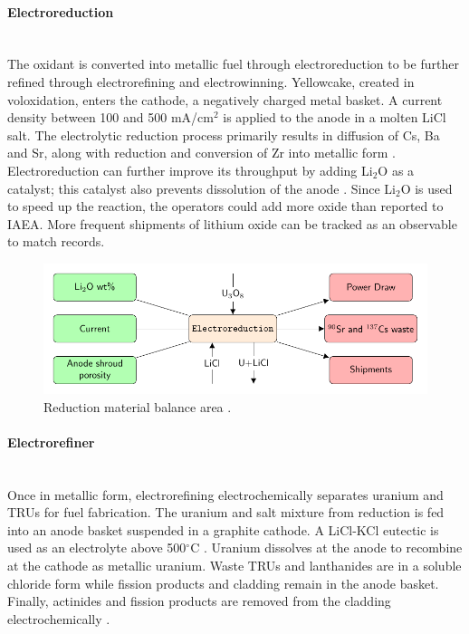 \paragraph{Electroreduction} \mbox{}\\
The oxidant is converted into metallic fuel through electroreduction to be further refined through electrorefining and electrowinning. 
Yellowcake, created in voloxidation, enters the cathode, a negatively charged metal basket. 
A current density between 100 and 500 mA/cm$^2$ is applied to the anode in a molten LiCl salt. 
The electrolytic reduction process primarily results in diffusion of Cs, Ba and Sr, along with reduction and conversion of Zr into metallic form \cite{choi_electrochemical_2015,flowsheet_1998}.
Electroreduction can further improve its throughput by adding Li$_2$O as a catalyst; this catalyst also prevents dissolution 
of the anode \cite{choi_electrochemical_2015}. Since Li$_2$O is used to speed up the reaction,
the operators could add more oxide than reported to \gls{IAEA}. More frequent shipments 
of lithium oxide can be tracked as an observable to match records.

\begin{figure}[h]
	\centering
	\includegraphics[width=0.9\linewidth]{images/reduction}
	\caption{Reduction material balance area \cite{lee_advanced_2008}.}
	\label{fig:reduction}
\end{figure}

\paragraph{Electrorefiner} \mbox{}\\
Once in metallic form, electrorefining electrochemically separates uranium and TRUs for fuel fabrication.
The uranium and salt mixture from reduction is fed into an anode basket suspended in a graphite cathode. 
A LiCl-KCl eutectic is used as an electrolyte above 500$^{\circ}$C \cite{flowsheet_1998,lee_korean_2011}. 
Uranium dissolves at the anode to recombine at the cathode as metallic uranium.
Waste TRUs and lanthanides are in a soluble chloride form  while fission products and cladding remain in the anode
basket. Finally, actinides and fission products are removed from the cladding electrochemically \cite{lee_korean_2011}.

